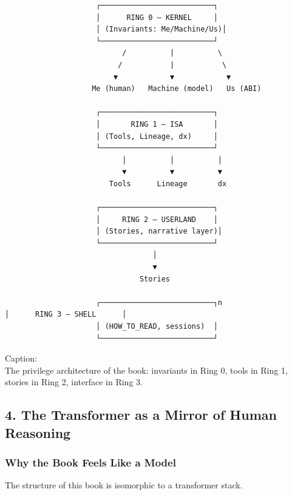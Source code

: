 \documentclass[
]{article}
\begin{document}
\begin{verbatim}
                     ┌──────────────────────────┐
                     │      RING 0 — KERNEL     │
                     │ (Invariants: Me/Machine/Us)│
                     └──────────────────────────┘
                           /          |          \
                          /           |           \
                         ▼            ▼            ▼
                    Me (human)   Machine (model)   Us (ABI)

                     ┌──────────────────────────┐
                     │       RING 1 — ISA       │
                     │ (Tools, Lineage, dx)     │
                     └──────────────────────────┘
                           │          │          │
                           ▼          ▼          ▼
                        Tools      Lineage       dx

                     ┌──────────────────────────┐
                     │     RING 2 — USERLAND    │
                     │ (Stories, narrative layer)│
                     └──────────────────────────┘
                                  │
                                  ▼
                               Stories

                     ┌──────────────────────────┐n                         │      RING 3 — SHELL      │
                     │ (HOW_TO_READ, sessions)  │
                     └──────────────────────────┘
\end{verbatim}

Caption:\\
The privilege architecture of the book: invariants in Ring 0, tools in
Ring 1, stories in Ring 2, interface in Ring 3.

\hypertarget{the-transformer-as-a-mirror-of-human-reasoning}{%
\subsection{4. The Transformer as a Mirror of Human
Reasoning}\label{the-transformer-as-a-mirror-of-human-reasoning}}

\hypertarget{why-the-book-feels-like-a-model}{%
\subsubsection{Why the Book Feels Like a
Model}\label{why-the-book-feels-like-a-model}}

The structure of this book is isomorphic to a transformer stack.
\end{document}
